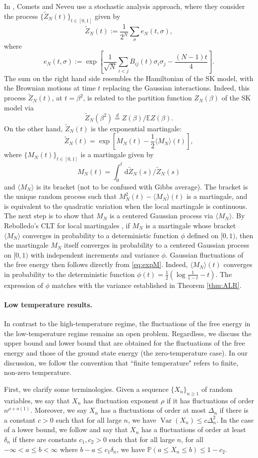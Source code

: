\documentclass[11pt]{article}
\numberwithin{equation}{section}
\DeclareMathOperator{\Var}{Var}
\newcommand{\beq}{ \begin{equation} }
\newcommand{\eeq}{ \end{equation} }
\newcommand{\ip}[1]{\langle {#1} \rangle }
\def \dd {\mathrm{d}}
\def \b {\beta}
\def \s {\sigma}
\def \r {\rho}
\newcommand{\bE}{\mathbb{E}}
\newcommand{\bP}{\mathbb{P}}
\theoremstyle{remark}
\begin{document}
In \cite{CometsNeveu}, Comets and Neveu use a stochastic analysis approach, where they consider the process $\{\tilde{Z}_N(t)\}_{t \in [0,1]}$ given by
\[
\tilde{Z}_N(t):= \frac1{2^N}\sum_\s e_N(t, \s),
\]
where
\[
e_N(t,\s):= \exp \left[\frac1{\sqrt N}\sum_{i<j}B_{ij}(t)\s_i\s_j - \frac{(N-1)t}{4}\right].
\]
The sum on the right hand side resembles the Hamiltonian of the SK model, with the Brownian motions at time $t$ replacing the Gaussian interactions. Indeed, this process $\tilde{Z}_N(t)$, at $t =\b^2$, is related to the partition function $Z_N(\b)$ of the SK model via
\[
\tilde{Z}_N(\b^2) \stackrel{d}{=} Z(\b)/\bE Z(\b).
\]
On the other hand, $\tilde{Z}_N(t)$ is the exponential martingale: 
\beq\label{eq:expM}
\tilde{Z}_N(t) = \exp \left[M_N(t)-\frac12\ip{M_N}(t)\right],
\eeq
where $\{M_N(t)\}_{t \in [0,1]}$ is a martingale given by
\[
M_N(t)= \int_0^t \dd \tilde{Z}_N(s)/\tilde{Z}_N(s)
\]
and $\ip{M_N}$ is its bracket (not to be confused with Gibbs average). The bracket is the unique random process such that $M_N^2(t)-\ip{M_N}(t)$ is a martingale, and is equivalent to the quadratic variation when the local martingale is continuous. The next step is to show that $M_N$ is a centered Gaussian process via $\ip{M_N}$. By Rebolledo's CLT for local martingales \cite{Rebolledo_1980}, if $M_N$ is a martingale whose bracket $\ip{M_N}$ converges in probability to a deterministic function $\phi$ defined on $[0,1)$, then the martingale $M_N$ itself converges in probability to a centered Gaussian process on $[0,1)$ with independent increments and variance $\phi$. Gaussian fluctuations of the free energy then follows directly from \eqref{eq:expM}. Indeed, $\ip{M_N}(t)$ converges in probability to the deterministic function $\phi(t)= \frac12 \left(\log \frac1{1-t} - t\right)$. The expression of $\phi$ matches with the variance established in Theorem \ref{thm:ALR}.

\paragraph{Low temperature results.} In contrast to the high-temperature regime, the fluctuations of the free energy in the low-temperature regime remains an open problem. Regardless, we discuss the upper bound and lower bound that are obtained for the fluctuations of the free energy and those of the ground state energy (the zero-temperature case). In our discussion, we follow the convention that ``finite temperature" refers to finite, non-zero temperature.

First, we clarify some terminologies.  Given a sequence $\{X_n\}_{n\geq 1}$ of random variables, we say that $X_n$  has fluctuation exponent $\r$ if it has fluctuations of order $n^{\r+o(1)}$. Moreover, we say $X_n$ has a fluctuations of order at most $\Delta_n$ if there is a constant $c>0$ such that for all large $n$, we have $\Var(X_n) \leq c \Delta_n^2$. In the case of a lower bound, we follow  and say that $X_n$ has a fluctuations of order at least $\delta_n$ if there are constants $c_1,c_2>0$ such that for all large $n$, for all $-\infty<a\leq b<\infty$ where $b-a\leq c_1 \delta_n$, we have $\bP(a \leq X_n \leq b) \leq 1-c_2.$
\end{document}
